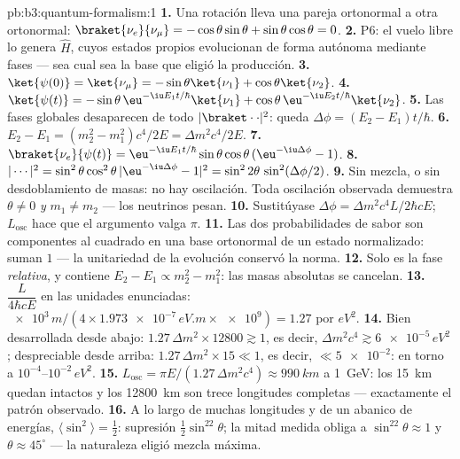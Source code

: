 \begin{solution}{pb:b3:quantum-formalism:1}
\textbf{1.} Una rotación lleva una pareja ortonormal a otra ortonormal:
$\braket{\nu_e}{\nu_\mu} = -\cos\theta\sin\theta +
\sin\theta\cos\theta = 0$.
\textbf{2.} P6: el vuelo libre lo genera $\hat H$, cuyos estados propios
evolucionan de forma autónoma mediante fases --- sea cual sea la base que
eligió la producción.
\textbf{3.} $\ket{\psi(0)} = \ket{\nu_\mu} = -\sin\theta\ket{\nu_1}
+ \cos\theta\ket{\nu_2}$.
\textbf{4.} $\ket{\psi(t)} = -\sin\theta\,\eu^{-\iu E_1t/\hbar}
\ket{\nu_1} + \cos\theta\,\eu^{-\iu E_2t/\hbar}\ket{\nu_2}$.
\textbf{5.} Las fases globales desaparecen de todo $|\braket\cdot\cdot|^2$:
queda $\Delta\phi = (E_2 - E_1)t/\hbar$.
\textbf{6.} $E_2 - E_1 = (m_2^2 - m_1^2)c^4/2E = \Delta m^2c^4/2E$.
\textbf{7.} $\braket{\nu_e}{\psi(t)} = \eu^{-\iu E_1t/\hbar}
\sin\theta\cos\theta\,(\eu^{-\iu\Delta\phi} - 1)$.
\textbf{8.} $|\cdots|^2 = \sin^2\theta\cos^2\theta\,|{\eu^{-\iu
\Delta\phi} - 1}|^2 = \sin^22\theta\,\sin^2(\Delta\phi/2)$.
\textbf{9.} Sin mezcla, o sin desdoblamiento de masas: no hay oscilación.
Toda oscilación observada demuestra $\theta \neq 0$ \emph{y} $m_1 \neq
m_2$ --- los neutrinos pesan.
\textbf{10.} Sustitúyase $\Delta\phi = \Delta m^2c^4L/2\hbar cE$;
$L_{\text{osc}}$ hace que el argumento valga $\pi$.
\textbf{11.} Las dos probabilidades de sabor son componentes al cuadrado en
una base ortonormal de un estado normalizado: suman $1$ ---
la unitariedad de la evolución conservó la norma.
\textbf{12.} Solo es  la fase \emph{relativa}, y contiene
$E_2 - E_1 \propto m_2^2 - m_1^2$: las masas absolutas se cancelan.
\textbf{13.} $\dfrac{L}{4\hbar cE}$ en las unidades enunciadas:
$\num{e3}\,\unit{m}/(4 \times \num{1.973e-7}\,\unit{eV.m} \times
\num{e9}) = 1.27$ por $\unit{eV^2}$.
\textbf{14.} Bien desarrollada desde abajo: $1.27\,\Delta m^2 \times 12800
\gtrsim 1$, es decir, $\Delta m^2c^4 \gtrsim \num{6e-5}\,\unit{eV^2}$;
despreciable desde arriba: $1.27\,\Delta m^2 \times 15 \ll 1$, es decir, $\ll
\num{5e-2}$: en torno a $10^{-4}$--$10^{-2}\,\unit{eV^2}$.
\textbf{15.} $L_{\text{osc}} = \pi E/(1.27\,\Delta m^2c^4) \approx
\qty{990}{km}$ a \qty{1}{GeV}: los \qty{15}{km} quedan intactos y los
\qty{12800}{km} son trece longitudes completas --- exactamente el patrón
observado.
\textbf{16.} A lo largo de muchas longitudes y de un abanico de energías,
$\langle\sin^2\rangle = \tfrac12$: supresión $\tfrac12\sin^22
\theta$; la mitad medida obliga a $\sin^22\theta \approx 1$ y
$\theta \approx 45^\circ$ --- la naturaleza eligió mezcla máxima.

\end{solution}
